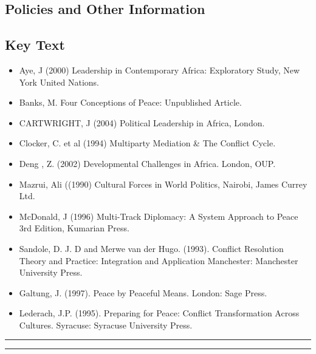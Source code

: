 \subsection*{Policies and Other Information}
\subsection*{Key Text}
\begin{itemize}
    \item Aye, J (2000) Leadership in Contemporary Africa: Exploratory Study, New York United Nations.
    \item Banks, M. Four Conceptions of Peace: Unpublished Article.
    \item CARTWRIGHT, J (2004) Political Leadership in Africa, London.
    \item Clocker, C. et al (1994) Multiparty Mediation & The Conflict Cycle.
    \item Deng , Z. (2002) Developmental Challenges in Africa. London, OUP.
    \item Mazrui, Ali ((1990) Cultural Forces in World Politics, Nairobi, James Currey Ltd.
    \item McDonald, J (1996) Multi-Track Diplomacy: A System Approach to Peace 3rd Edition, Kumarian Press.
    \item Sandole, D. J. D and Merwe van der Hugo. (1993). Conflict Resolution Theory and Practice: Integration and Application Manchester: Manchester University Press.
    \item Galtung, J. (1997). Peace by Peaceful Means. London: Sage Press.
    \item Lederach, J.P. (1995). Preparing for Peace: Conflict Transformation Across Cultures. Syracuse: Syracuse University Press.
\end{itemize}
\vspace{2ex}\hrule
\vspace{2ex}\hrule\vspace{2ex}
